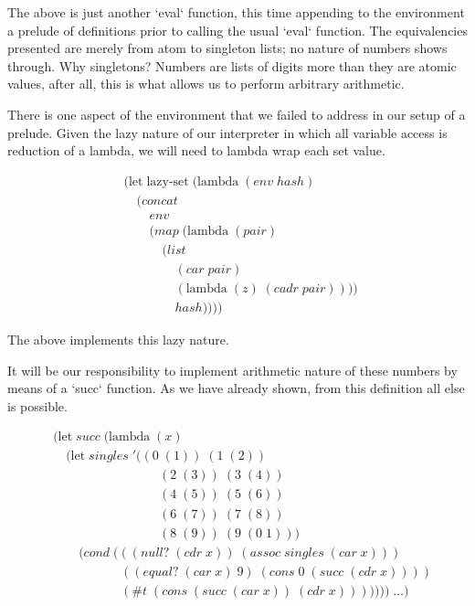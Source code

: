 The above is just another `eval` function, this time appending to the environment a prelude of definitions prior to calling the usual `eval` function. The equivalencies presented are merely from atom to singleton lists; no nature of numbers shows through. Why singletons? Numbers are lists of digits more than they are atomic values, after all, this is what allows us to perform arbitrary arithmetic.

There is one aspect of the environment that we failed to address in our setup 
of a prelude. Given the lazy nature of our interpreter in which all variable
access is reduction of a lambda, we will need to lambda wrap each set value.

\begin{align*}
& (\text{let} \; \text{lazy-set} \; (\text{lambda} \; (env \; hash)
\\& \quad (concat
\\& \qquad env
\\& \qquad (map \; (\text{lambda} \; (pair) \; 
\\& \qquad \quad (list \; 
\\& \qquad \qquad (car \; pair) \; 
\\& \qquad \qquad (\text{lambda} \; (z) \; (cadr \; pair)))) \; 
\\& \qquad \qquad hash))))
\end{align*}

The above implements this lazy nature.

It will be our responsibility to implement arithmetic nature of these numbers 
by means of a `succ` function. As we have already shown, from this definition 
all else is possible.

\begin{align*}
& (\text{let} \; succ \; (\text{lambda} \; (x)
\\& \quad (\text{let} \; singles \; '((0 \; (1)) \; (1 \; (2)) \; 
\\& \qquad \qquad \qquad \qquad \; (2 \; (3)) \; (3 \; (4)) \; 
\\& \qquad \qquad \qquad \qquad \; (4 \; (5)) \; (5 \; (6)) \; 
\\& \qquad \qquad \qquad \qquad \; (6 \; (7)) \; (7 \; (8)) \; 
\\& \qquad \qquad \qquad \qquad \; (8 \; (9)) \; (9 \; (0 \; 1)))
\\& \qquad (cond \; (((null? \; (cdr \; x)) \; (assoc \; singles \; (car \; x)))
\\& \qquad \qquad \quad \; ((equal? \; (car \; x) \; 9) \; (cons \; 0 \; (succ \; (cdr \; x))))
\\& \qquad \qquad \quad \; (\#t \; (cons \; (succ \; (car \; x)) \; (cdr \; x))))))) \; \dots)
\end{align*}

